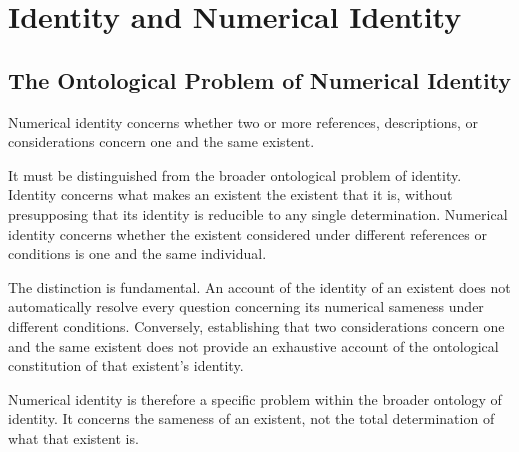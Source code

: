 %
%
%
%

\section{Identity and Numerical Identity}
\label{sec:identity-and-numerical-identity}

\subsection{The Ontological Problem of Numerical Identity}

Numerical identity concerns whether two or more references,
descriptions, or considerations concern one and the same existent.

It must be distinguished from the broader ontological problem
of identity. Identity concerns what makes an existent the existent that it is,
without presupposing that its identity is reducible to any single
determination.
Numerical identity concerns whether the existent considered
under different references or conditions is one and the same
individual.

The distinction is fundamental. An account of the identity
of an existent does not automatically resolve every question
concerning its numerical sameness under different conditions.
Conversely, establishing that two considerations concern
one and the same existent does not provide an exhaustive
account of the ontological constitution of that existent's
identity.

Numerical identity is therefore a specific problem within
the broader ontology of identity. It concerns the sameness
of an existent, not the total determination of what that
existent is.

